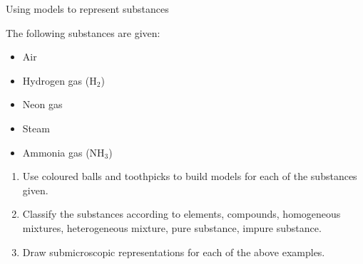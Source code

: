 \vspace{-1cm}
  \label{m38708*eip-326}
\begin{activity}{Using models to represent substances}{The following substances are given:
\label{m38708*eip-id1166921187210}
\begin{itemize}[noitemsep]
    \item Air
    \item Hydrogen gas ($\mathrm{H}_2$)
    \item Neon gas
    \item Steam
    \item Ammonia gas ($\mathrm{NH}_3$)
\end{itemize}
\begin{enumerate}[noitemsep, label=\textbf{\arabic*}.]
\item Use coloured balls and toothpicks to build models for each of the substances given.
\item Classify the substances according to elements, compounds, homogeneous mixtures, heterogeneous mixture, pure substance, impure substance.
\item Draw submicroscopic representations for each of the above examples.
\end{enumerate}
}
\end{activity}
\par \label{m38708*secfhsst!!!underscore!!!id212}
